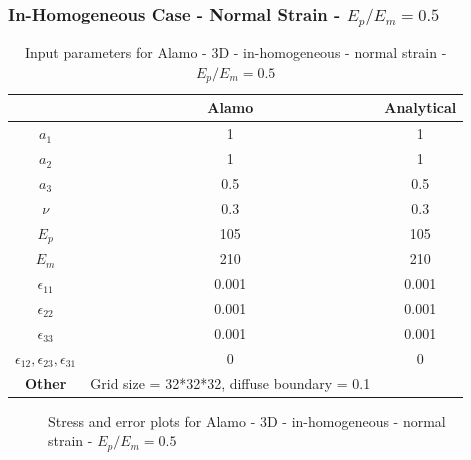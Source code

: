 \documentclass[12pt, a4paper]{report}
\begin{document}
\subsubsection{In-Homogeneous Case - Normal Strain - $E_p/E_m = 0.5$}
\begin{table}[H]
    \centering
    \begin{tabular}{|c|c|c|}
        \hline
        & \textbf{Alamo} &\textbf{Analytical}\\
        \hline
        \textbf{$a_1$} & 1 & 1 \\
        \hline
        \textbf{$a_2$} & 1 & 1 \\
        \hline
        \textbf{$a_3$} & 0.5 & 0.5 \\
        \hline
        \textbf{$\nu$} & 0.3 & 0.3 \\
        \hline
        \textbf{$E_p$} & 105 & 105 \\
        \hline
        \textbf{$E_m$} & 210 & 210 \\
        \hline
        \textbf{$\epsilon_{11}$} & 0.001 & 0.001 \\
        \hline
        \textbf{$\epsilon_{22}$} & 0.001 & 0.001 \\
        \hline
        \textbf{$\epsilon_{33}$} & 0.001 & 0.001 \\
        \hline
        \textbf{$\epsilon_{12}, \epsilon_{23}, \epsilon_{31}$} & 0 & 0 \\
        \hline
        \textbf{Other} & Grid size = 32*32*32, diffuse boundary = 0.1 &  \\
        \hline
    \end{tabular}
    \caption{Input parameters for Alamo - 3D - in-homogeneous - normal strain - $E_p/E_m = 0.5$}
\end{table}

\begin{figure}[htbp]
  \centering
  \hfill
  \caption{Stress and error plots for Alamo - 3D - in-homogeneous - normal strain - $E_p/E_m = 0.5$}
\end{figure}
\end{document}
